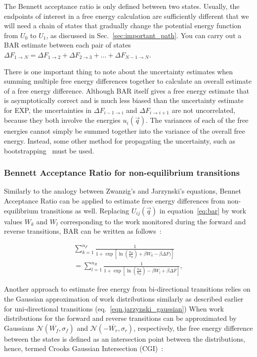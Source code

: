 \documentclass[9pt,bestpractices]{livecoms}
\begin{document}
The Bennett acceptance ratio is only defined between two states. Usually, the endpoints of interest in a free energy calculation are sufficiently different that we will need a chain of states that gradually change the potential energy function from $U_0$ to $U_1$, as discussed in Sec.~\ref{sec:important_path}. You can carry out a BAR estimate between each pair of states $\Delta F_{1 \rightarrow N} = \Delta {F_{1\rightarrow 2}} + \Delta {F_{2\rightarrow 3}} +  \ldots + \Delta F_{N-1\rightarrow N}$.

There is one important thing to note about the uncertainty estimates when summing multiple free energy differences together to calculate an overall estimate of a free energy difference. Although BAR itself gives a free energy estimate that is asymptotically correct and is much less biased than the uncertainty estimate for EXP, the uncertainties in $\Delta {F_{i-1\rightarrow i}}$ and $\Delta {F_{i\rightarrow i+1}}$ are not uncorrelated, because they both involve the energies $u_i(\vec{q})$. The variances of each of the free energies cannot simply be summed together into the variance of the overall free energy. Instead, some other method for propagating the uncertainty, such as bootstrapping~\cite{grossfield2018best} must be used.

\subsubsection{Bennett Acceptance Ratio for non-equilibrium transitions}
Similarly to the analogy between Zwanzig's and Jarzynski's equations, Bennet Acceptance Ratio can be applied to estimate free energy differences from non-equilibrium transitions as well.
Replacing $U_{ij}(\vec{q})$ in equation~\ref{eq:bar} by work values $W_k$ and $W_l$ corresponding to the work monitored during the forward and reverse transitions, BAR can be written as follows~\cite{shirts2003equilibrium}:

\begin{eqnarray}
 \sum_{k=1}^{n_F} \frac{1}{1 + \exp[\ln(\frac{n_F}{n_R}) + \beta W_{k} - \beta\Delta F)]} \nonumber \\
 =\sum_{l=1}^{n_R} \frac{1}{1 + \exp[\ln(\frac{n_R}{n_F}) - \beta W_{l} + \beta\Delta F]},
\end{eqnarray}\label{eq:bar_noneq}

Another approach to estimate free energy from bi-directional transitions relies on the Gaussian approximation of work distributions similarly as described earlier for uni-directional transitions (eq.~\ref{eqn.jarzynski_gaussian})
When work distributions for the forward and reverse transitions can be approximated by Gaussians $\mathcal{N}(\overline{W_f},\sigma_f)$ and $\mathcal{N}(-\overline{W_r},\sigma_r)$, respectively, the free energy difference between the states is defined as an intersection point between the distributions, hence, termed Crooks Gaussian Intersection (CGI)~\cite{goette2009accuracy}:
\end{document}
